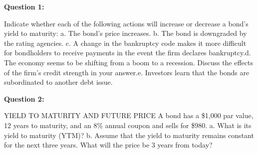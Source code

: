 \documentclass[11pt]{article}
\begin{document}
\textbf{Question 1:}
\bigskip

Indicate whether each of the following actions will increase or decrease a bond’s yield to maturity: 
a. The bond’s price increases. 
b. The bond is downgraded by the rating agencies. 
c. A change in the bankruptcy code makes it more difficult for bondholders to receive payments in the event the firm declares bankruptcy.d. The economy seems to be shifting from a boom to a recession. Discuss the effects of the firm’s credit strength in your answer.e. Investors learn that the bonds are subordinated to another debt issue.

\bigskip
\bigskip


\textbf{Question 2:}
\bigskip

YIELD TO MATURITY AND FUTURE PRICE A bond has a \$1,000 par value, 12 years to maturity, and an 8\% annual coupon and sells for \$980. 
a. What is its yield to maturity (YTM)? 
b. Assume that the yield to maturity remains constant for the next three years. What will the price be 3 years from today?

\bigskip
\bigskip
\end{document}
